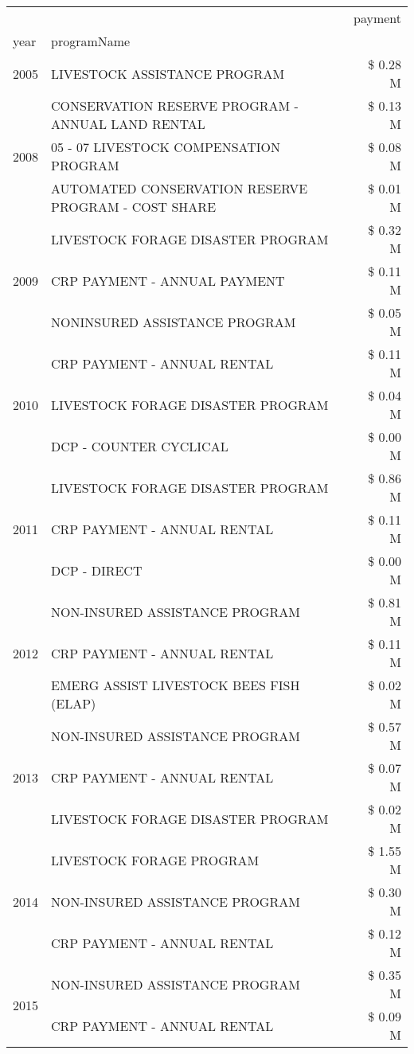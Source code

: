 \begin{tabular}{llr}
\toprule
 &  & payment \\
year & programName &  \\
\midrule
2005 & LIVESTOCK ASSISTANCE PROGRAM & \$ 0.28 M \\
\cline{1-3}
\multirow[t]{3}{*}{2008} & CONSERVATION RESERVE PROGRAM - ANNUAL LAND RENTAL & \$ 0.13 M \\
 & 05 - 07 LIVESTOCK COMPENSATION PROGRAM & \$ 0.08 M \\
 & AUTOMATED CONSERVATION RESERVE PROGRAM - COST SHARE & \$ 0.01 M \\
\cline{1-3}
\multirow[t]{3}{*}{2009} & LIVESTOCK FORAGE DISASTER  PROGRAM & \$ 0.32 M \\
 & CRP PAYMENT - ANNUAL PAYMENT & \$ 0.11 M \\
 & NONINSURED ASSISTANCE PROGRAM & \$ 0.05 M \\
\cline{1-3}
\multirow[t]{3}{*}{2010} & CRP PAYMENT - ANNUAL RENTAL & \$ 0.11 M \\
 & LIVESTOCK FORAGE DISASTER PROGRAM & \$ 0.04 M \\
 & DCP - COUNTER CYCLICAL & \$ 0.00 M \\
\cline{1-3}
\multirow[t]{3}{*}{2011} & LIVESTOCK FORAGE DISASTER PROGRAM & \$ 0.86 M \\
 & CRP PAYMENT - ANNUAL RENTAL & \$ 0.11 M \\
 & DCP - DIRECT & \$ 0.00 M \\
\cline{1-3}
\multirow[t]{3}{*}{2012} & NON-INSURED ASSISTANCE PROGRAM & \$ 0.81 M \\
 & CRP PAYMENT - ANNUAL RENTAL & \$ 0.11 M \\
 & EMERG ASSIST LIVESTOCK BEES FISH (ELAP) & \$ 0.02 M \\
\cline{1-3}
\multirow[t]{3}{*}{2013} & NON-INSURED ASSISTANCE PROGRAM & \$ 0.57 M \\
 & CRP PAYMENT - ANNUAL RENTAL & \$ 0.07 M \\
 & LIVESTOCK FORAGE DISASTER PROGRAM & \$ 0.02 M \\
\cline{1-3}
\multirow[t]{3}{*}{2014} & LIVESTOCK FORAGE PROGRAM & \$ 1.55 M \\
 & NON-INSURED ASSISTANCE PROGRAM & \$ 0.30 M \\
 & CRP PAYMENT - ANNUAL RENTAL & \$ 0.12 M \\
\cline{1-3}
\multirow[t]{3}{*}{2015} & NON-INSURED ASSISTANCE PROGRAM & \$ 0.35 M \\
 & CRP PAYMENT - ANNUAL RENTAL & \$ 0.09 M \\

\end{tabular}

